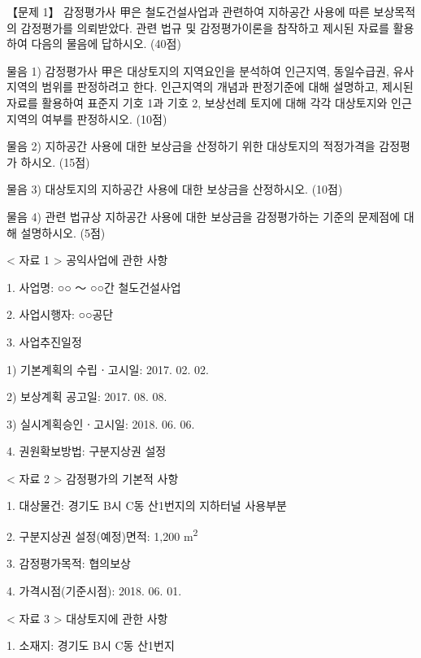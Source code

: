 \begin{longquestion}{【문제 1】}
감정평가사 甲은 철도건설사업과 관련하여 지하공간 사용에 따른 보상목적의 감정평가를 의뢰받았다. 관련 법규 및 감정평가이론을 참작하고 제시된 자료를 활용하여 다음의 물음에 답하시오. (40점) \par
\medskip\noindent 물음 1) 감정평가사 甲은 대상토지의 지역요인을 분석하여 인근지역, 동일수급권, 유사지역의 범위를 판정하려고 한다. 인근지역의 개념과 판정기준에 대해 설명하고, 제시된 자료를 활용하여 표준지 기호 1과 기호 2, 보상선례 토지에 대해 각각 대상토지와 인근지역의 여부를 판정하시오. (10점) \par
\medskip\noindent 물음 2) 지하공간 사용에 대한 보상금을 산정하기 위한 대상토지의 적정가격을 감정평가 하시오. (15점) \par
\medskip\noindent 물음 3) 대상토지의 지하공간 사용에 대한 보상금을 산정하시오. (10점) \par
\medskip\noindent 물음 4) 관련 법규상 지하공간 사용에 대한 보상금을 감정평가하는 기준의 문제점에 대해 설명하시오. (5점) \par
< 자료 1 > 공익사업에 관한 사항 \par
1. 사업명: ○○ ～ ○○간 철도건설사업 \par
2. 사업시행자: ○○공단 \par
3. 사업추진일정 \par
1) 기본계획의 수립ㆍ고시일: 2017. 02. 02. \par
2) 보상계획 공고일: 2017. 08. 08. \par
3) 실시계획승인ㆍ고시일: 2018. 06. 06. \par
4. 권원확보방법: 구분지상권 설정 \par
< 자료 2 > 감정평가의 기본적 사항 \par
1. 대상물건: 경기도 B시 C동 산1번지의 지하터널 사용부분 \par
2. 구분지상권 설정(예정)면적: 1,200 m\textsuperscript{2} \par
3. 감정평가목적: 협의보상 \par
4. 가격시점(기준시점): 2018. 06. 01. \par
< 자료 3 > 대상토지에 관한 사항 \par
1. 소재지: 경기도 B시 C동 산1번지 \par

\end{longquestion}
